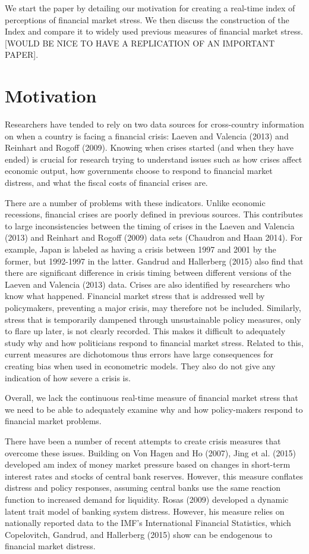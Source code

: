 \documentclass[]{article}
\begin{document}
We start the paper by detailing our motivation for creating a real-time
index of perceptions of financial market stress. We then discuss the
construction of the Index and compare it to widely used previous
measures of financial market stress. {[}WOULD BE NICE TO HAVE A
REPLICATION OF AN IMPORTANT PAPER{]}.

\section{Motivation}\label{motivation}

Researchers have tended to rely on two data sources for cross-country
information on when a country is facing a financial crisis: Laeven and
Valencia (2013) and Reinhart and Rogoff (2009). Knowing when crises
started (and when they have ended) is crucial for research trying to
understand issues such as how crises affect economic output, how
governments choose to respond to financial market distress, and what the
fiscal costs of financial crises are.

There are a number of problems with these indicators. Unlike economic
recessions, financial crises are poorly defined in previous sources.
This contributes to large inconsistencies between the timing of crises
in the Laeven and Valencia (2013) and Reinhart and Rogoff (2009) data
sets (Chaudron and Haan 2014). For example, Japan is labeled as having a
crisis between 1997 and 2001 by the former, but 1992-1997 in the latter.
Gandrud and Hallerberg (2015) also find that there are significant
difference in crisis timing between different versions of the Laeven and
Valencia (2013) data. Crises are also identified by researchers who know
what happened. Financial market stress that is addressed well by
policymakers, preventing a major crisis, may therefore not be included.
Similarly, stress that is temporarily dampened through unsustainable
policy measures, only to flare up later, is not clearly recorded. This
makes it difficult to adequately study why and how politicians respond
to financial market stress. Related to this, current measures are
dichotomous thus errors have large consequences for creating bias when
used in econometric models. They also do not give any indication of how
severe a crisis is.

Overall, we lack the continuous real-time measure of financial market
stress that we need to be able to adequately examine why and how
policy-makers respond to financial market problems.

There have been a number of recent attempts to create crisis measures
that overcome these issues. Building on {Von Hagen} and Ho (2007), Jing
et al. (2015) developed am index of money market pressure based on
changes in short-term interest rates and stocks of central bank
reserves. However, this measure conflates distress and policy responses,
assuming central banks use the same reaction function to increased
demand for liquidity. Rosas (2009) developed a dynamic latent trait
model of banking system distress. However, his measure relies on
nationally reported data to the IMF's International Financial
Statistics, which Copelovitch, Gandrud, and Hallerberg (2015) show can
be endogenous to financial market distress.
\end{document}
